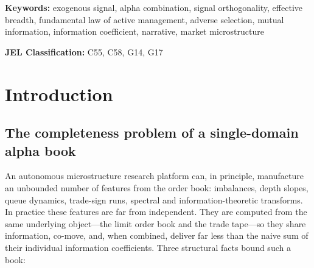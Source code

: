 \documentclass[11pt,a4paper]{article}
\theoremstyle{definition}
\theoremstyle{plain}
\begin{document}
\begin{abstract}
Third, \emph{partial evasion of the adverse-selection barrier}: because a slow exogenous signal is
harvested by patient execution over its own horizon rather than by reactive spread-crossing, its
coupling to the fillable-state indicator---the mechanism that destroys microstructure edge---is
weaker, so its conditional information coefficient need not collapse in the same way. Each claim is
stated as a hypothesis with an explicit, leakage-controlled, false-discovery-rate-corrected test; we
report no performance figures. The contribution is a theory and a protocol for making an autonomous
microstructure research platform \emph{more complete}---a decorrelated, multi-domain alpha book that
reports its own honest effective breadth---by admitting narrative as a first-class, gated signal
source.
\end{abstract}

\smallskip
\noindent\textbf{Keywords:} exogenous signal, alpha combination, signal orthogonality, effective
breadth, fundamental law of active management, adverse selection, mutual information, information
coefficient, narrative, market microstructure

\smallskip
\noindent\textbf{JEL Classification:} C55, C58, G14, G17

\tableofcontents
\bigskip

\section{Introduction}
\label{sec:intro}

\subsection{The completeness problem of a single-domain alpha book}

An autonomous microstructure research platform can, in principle, manufacture an unbounded number of
features from the order book: imbalances, depth slopes, queue dynamics, trade-sign runs, spectral and
information-theoretic transforms. In practice these features are far from independent. They are
computed from the same underlying object---the limit order book and the trade tape---so they share
information, co-move, and, when combined, deliver far less than the naive sum of their individual
information coefficients. Three structural facts bound such a book:
\end{document}
